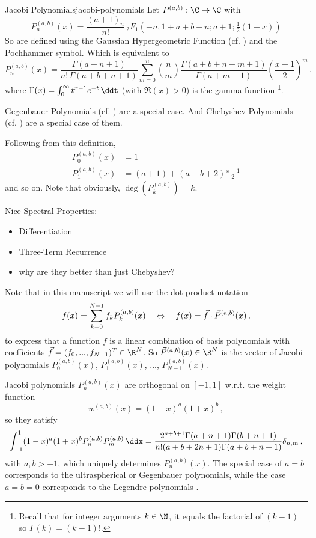 \begin{definition}{Jacobi Polynomials}{jacobi-polynomials}
  Let $P^{(a, b)}: \C \mapsto \C$ with
  \[P^{(a,b)}_n(x) = {\frac{(a +1)_{n}}{n!}}\,{}_{2}F_{1}\left(-n,1+a +b +n;a +1;{\tfrac  {1}{2}}(1-x)\right)\]
  So are defined using the Gaussian Hypergeometric Function (cf. ) and the Pochhammer symbol.
  Which is equivalent to
  $$P_{n}^{{(a, b)}}(x)={\frac  {\Gamma (a +n+1)}{n!\,\Gamma (a +b +n+1)}}\sum _{{m=0}}^{n}\binom{n}{m}{\frac{\Gamma (a +b +n+m+1)}{\Gamma (a +m+1)}}\left({\frac{x-1}{2}}\right)^{m}\,.$$
  where $\Gamma (x)=\int _{0}^{\infty }t^{x-1}e^{-t}\,\ddt$ (with $\Re(x)>0$) is the gamma function \footnote{Recall that for integer arguments $k \in \N$, it equals the factorial of $(k-1)$ so $\Gamma(k) = (k-1)!$.}.

  Gegenbauer Polynomials (cf. ) are a special case. And
  Chebyshev Polynomials (cf. ) are a special case of them.
\end{definition}

Following from this definition,
\begin{align*}
  P_0^{(a, b)}(x)   & = 1                            \\
  P_{1}^{(a, b)}(x) & = (a+1)+(a+b+2){\frac{x-1}{2}}
\end{align*}
and so on. Note that obviously, $\deg\left(P_k^{(a, b)}\right) = k$.

Nice Spectral Properties:
\begin{itemize}
  \item Differentiation
  \item Three-Term Recurrence
  \item why are they better than just Chebyshev?
\end{itemize}

Note that in this manuscript we will use the dot-product notation
$$f(x) = \sum_{k=0}^{N-1} f_k P_k^{(a, b)}(x) \quad\Leftrightarrow\quad f(x) = \vec{f} \cdot \vec{P}^{(a, b)}(x)\,,$$
to express that a function $f$ is a linear combination of basis polynomials with coefficients $\vec{f} = (f_0, ..., f_{N-1})^T \in \R^N$.
So $\vec{P}^{(a, b)}(x) \in \R^N$ is the vector of Jacobi polynomials $P^{(a, b)}_0(x)$, $P^{(a, b)}_1(x)$, ..., $P^{(a, b)}_{N-1}(x)$.

Jacobi polynomials $P_n^{(a,b)}(x)$ are orthogonal on $[-1,1]$ w.r.t. the weight function
\begin{equation*}
  w^{(a,b)}(x)=(1-x)^a (1+x)^b\,,
\end{equation*}
so they satisfy
\begin{align*}\label{eq:orthogonalityconditionJacobi}
  \int_{-1}^1(1-x)^a(1+x)^bP_n^{(a,b)}P_m^{(a,b)}\,\ddx = \frac{2^{a+b+1} \Gamma (a+n+1) \Gamma (b+n+1)}{n! (a+b+2 n+1) \Gamma (a+b+n+1)} \delta_{n,m}\,,
\end{align*}
with $a	,b>-1$, which uniquely determines $P_n^{(a,b)}(x)$. The special case of $a=b$ corresponds to the ultraspherical or Gegenbauer polynomials, while the case $a=b=0$ corresponds to the Legendre polynomials \cite{2018-nist}.

